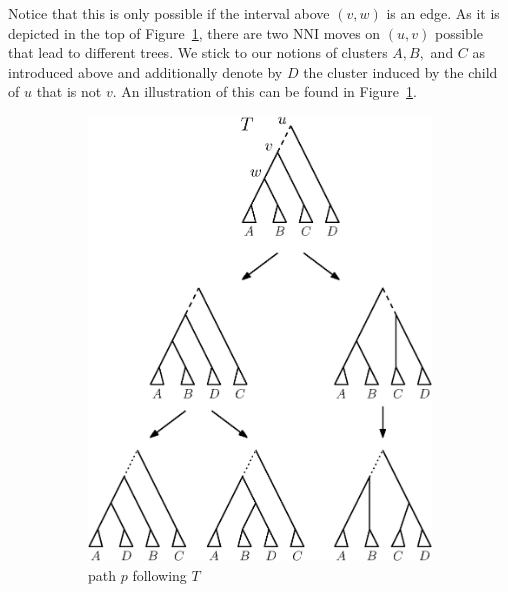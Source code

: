 \documentclass{amsart}
\newcommand{\nni}{\mathrm{NNI}}
\begin{document}
\begin{enumerate}[{Case} (1).]
Notice that this is only possible if the interval above $(v,w)$ is an edge.
As it is depicted in the top of Figure~\ref{fig:thm_fp_nni2a}, there are two $\nni$ moves on $(u,v)$ possible that lead to different trees.
We stick to our notions of clusters $A,B,$ and $C$ as introduced above and additionally denote by $D$ the cluster induced by the child of $u$ that is not $v$.
An illustration of this can be found in Figure~\ref{fig:thm_fp_nni2a}.

\begin{figure}[H]
	\begin{subfigure}[b]{.45\textwidth}
		\centering
		\includegraphics[width=0.9\linewidth]{thm_fp_nni2a.eps}
		\vspace{12pt}
		\caption{path $p$ following $T$}
		\label{fig:thm_fp_nni2a}
	\end{subfigure}
	\begin{subfigure}[b]{.45\textwidth}
		\centering

\end{subfigure}
\end{figure}
\end{enumerate}
\end{document}
